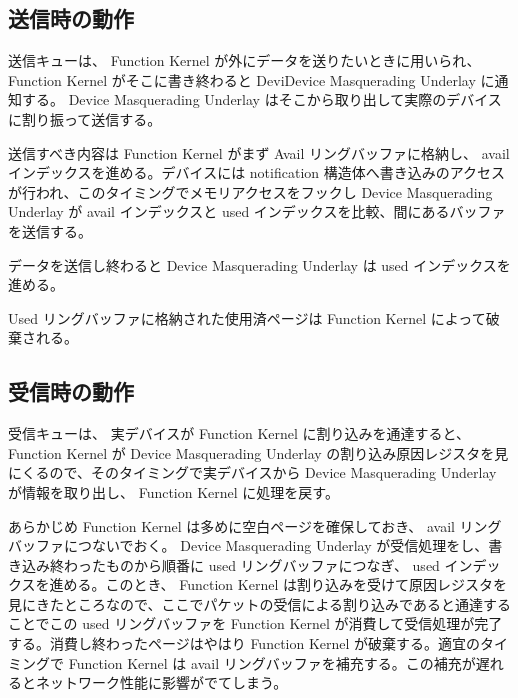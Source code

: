 \documentclass[a4paper,11pt,report]{ltjsbook}
\begin{document}
\subsection{送信時の動作}

送信キューは、 Function Kernel が外にデータを送りたいときに用いられ、 Function Kernel がそこに書き終わると DeviDevice Masquerading Underlay に通知する。 Device Masquerading Underlay はそこから取り出して実際のデバイスに割り振って送信する。

送信すべき内容は Function Kernel がまず Avail リングバッファに格納し、 avail インデックスを進める。デバイスには notification 構造体へ書き込みのアクセスが行われ、このタイミングでメモリアクセスをフックし Device Masquerading Underlay が avail インデックスと used インデックスを比較、間にあるバッファを送信する。

データを送信し終わると Device Masquerading Underlay は used インデックスを進める。

Used リングバッファに格納された使用済ページは Function Kernel によって破棄される。

\subsection{受信時の動作}

受信キューは、 実デバイスが Function Kernel に割り込みを通達すると、 Function Kernel が Device Masquerading Underlay の割り込み原因レジスタを見にくるので、そのタイミングで実デバイスから Device Masquerading Underlay が情報を取り出し、 Function Kernel に処理を戻す。

あらかじめ Function Kernel は多めに空白ページを確保しておき、 avail リングバッファにつないでおく。 Device Masquerading Underlay が受信処理をし、書き込み終わったものから順番に used リングバッファにつなぎ、 used インデックスを進める。このとき、 Function Kernel は割り込みを受けて原因レジスタを見にきたところなので、ここでパケットの受信による割り込みであると通達することでこの used リングバッファを Function Kernel が消費して受信処理が完了する。消費し終わったページはやはり Function Kernel が破棄する。適宜のタイミングで Function Kernel は avail リングバッファを補充する。この補充が遅れるとネットワーク性能に影響がでてしまう。

\end{document}
